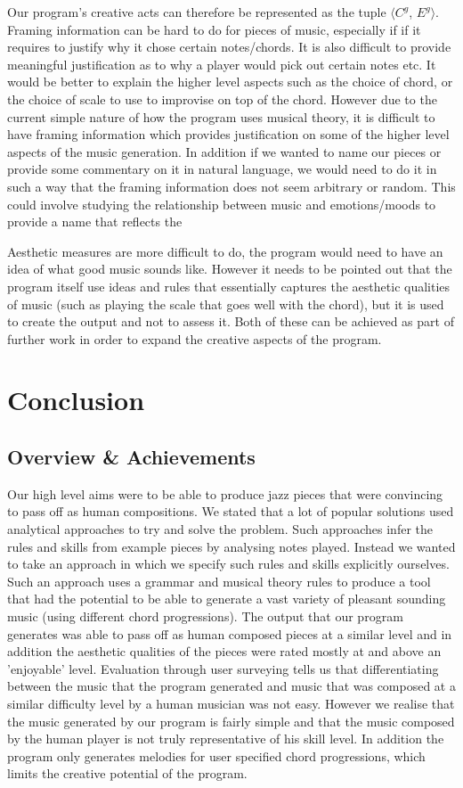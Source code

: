 \documentclass[pdftex,12pt,a4paper]{report}
\begin{document}
Our program's creative acts can therefore be represented as the tuple $\langle${$C^{g}$, $E^{g}$}$\rangle$. 
Framing information can be hard to do for pieces of music, especially if if it requires to justify why it chose certain notes/chords. It is also difficult to provide meaningful justification as to why a player would pick out certain notes etc. It would be better to explain the higher level aspects such as the choice of chord, or the choice of scale to use to improvise on top of the chord. However due to the current simple nature of how the program uses musical theory, it is difficult to have framing information which provides justification on some of the higher level aspects of the music generation. In addition if we wanted to name our pieces or provide some commentary on it in natural language, we would need to do it in such a way that the framing information does not seem arbitrary or random. This could involve studying the relationship between music and emotions/moods to provide a name that reflects the 

Aesthetic measures are more difficult to do, the program would need to have an idea of what good music sounds like. However it needs to be pointed out that the program itself use ideas and rules that essentially captures the aesthetic qualities of music (such as playing the scale that goes well with the chord), but it is used to create the output and not to assess it. Both of these can be achieved as part of further work in order to expand the creative aspects of the program. 


\chapter{Conclusion}

\section{Overview \& Achievements}
Our high level aims were to be able to produce jazz pieces that were convincing to pass off as human compositions. We stated that a lot of popular solutions used analytical approaches to try and solve the problem. Such approaches infer the rules and skills from example pieces by analysing notes played. Instead we wanted to take an approach in which we specify such rules and skills explicitly ourselves. Such an approach uses a grammar and musical theory rules to produce a tool that had the potential to be able to generate a vast variety of pleasant sounding music (using different chord progressions). The output that our program generates was able to pass off as human composed pieces at a similar level and in addition the aesthetic qualities of the pieces were rated mostly at and above an 'enjoyable' level. Evaluation through user surveying tells us that differentiating between the music that the program generated and music that was composed at a similar difficulty level by a human musician was not easy. However we realise that the music generated by our program is fairly simple and that the music composed by the human player is not truly representative of his skill level. In addition the program only generates melodies for user specified chord progressions, which limits the creative potential of the program.
\end{document}
